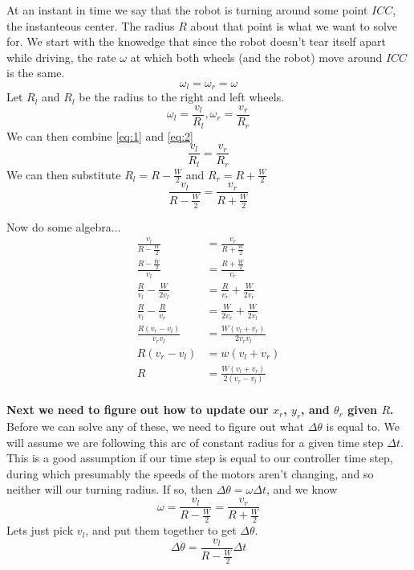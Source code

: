 \documentclass{article}
\begin{document}
At an instant in time we say that the robot is turning around some point $ICC$, the instanteous center. The radius $R$ about that point is what we want to solve for. We start with the knowedge that since the robot doesn't tear itself apart while driving, the rate $\omega$ at which both wheels (and the robot) move around $ICC$ is the same.
\begin{equation} \label{eq:1}
  \omega_l = \omega_r = \omega
\end{equation}
Let $R_l$ and $R_l$ be the radius to the right and left wheels.
\begin{equation} \label{eq:2}
  \omega_l = \frac{v_l}{R_l}, \omega_r = \frac{v_r}{R_r}
\end{equation}
We can then combine \ref{eq:1} and \ref{eq:2}
\begin{equation}
  \frac{v_l}{R_l} = \frac{v_r}{R_r}
\end{equation}
We can then substitute $R_l = R - \frac{W}{2}$ and $R_r = R + \frac{W}{2}$
\begin{equation}
  \frac{v_l}{R-\frac{W}{2}} = \frac{v_r}{R + \frac{W}{2}}
\end{equation}

Now do some algebra...
\begin{align*}
  \frac{v_l}{R-\frac{W}{2}} &= \frac{v_r}{R + \frac{W}{2}} \\[1em]
  \frac{R-\frac{W}{2}}{v_l} &= \frac{R + \frac{W}{2}}{v_r} \\[1em]
  \frac{R}{v_l}-\frac{W}{2v_l} &= \frac{R}{v_r} + \frac{W}{2v_r} \\[1em]
  \frac{R}{v_l}-\frac{R}{v_r} &= \frac{W}{2v_r}+\frac{W}{2v_l} \\[1em]
  \frac{R(v_r-v_l)}{v_rv_l} &= \frac{W(v_l+v_r)}{2v_rv_l} \\[1em]
  R(v_r-v_l) &= w(v_l+v_r) \\[1em]
  R &= \frac{W(v_l+v_r)}{2(v_r-v_l)} \\[1em]
\end{align*}

\textbf{Next we need to figure out how to update our $x_r$, $y_r$, and $\theta_r$ given $R$.} \\

Before we can solve any of these, we need to figure out what $\Delta\theta$ is equal to. We will assume we are following this arc of constant radius for a given time step $\Delta t$. This is a good assumption if our time step is equal to our controller time step, during which presumably the speeds of the motors aren't changing, and so neither will our turning radius. If so, then $\Delta\theta = \omega\Delta t$, and we know
$$\omega=\dfrac{v_l}{R-\frac{W}{2}} = \dfrac{v_r}{R+\frac{W}{2}}$$
Lets just pick $v_l$, and put them together to get $\Delta\theta$.
$$\Delta\theta = \dfrac{v_l}{R-\frac{W}{2}}\Delta t$$
\end{document}
